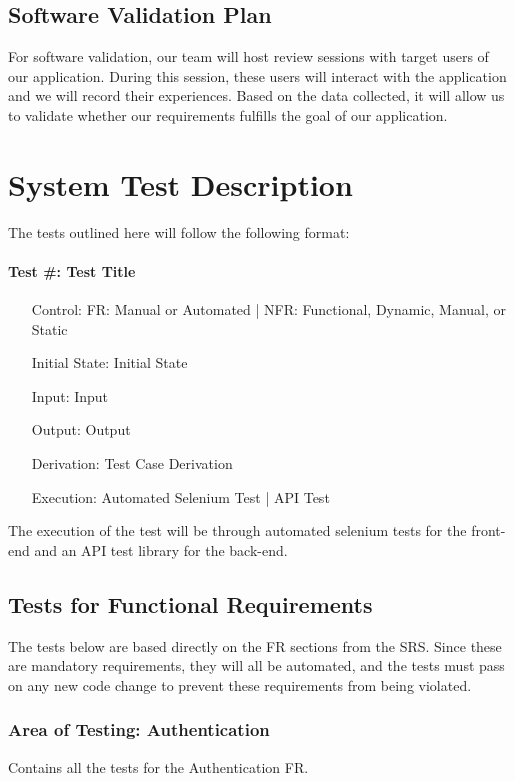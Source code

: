 \documentclass[12pt, titlepage]{article}
\begin{document}
\subsection{Software Validation Plan}
For software validation, our team will host review sessions with target users of our application. During this session, these users will interact with the application and we will record their experiences. Based on the data collected, it will allow us to validate whether our requirements fulfills the goal of our application.

\section{System Test Description}
The tests outlined here will follow the following format:
\paragraph*{Test \#{}: Test Title}
\begin{itemize}
	\item[Control:] FR: Manual or Automated | NFR: Functional, Dynamic, Manual, or Static
	\item[Initial State:] Initial State
	\item[Input:] Input
	\item[Output:] Output
	\item[Derivation:] Test Case Derivation
	\item[Execution:] Automated Selenium Test | API Test
\end{itemize}
The execution of the test will be through automated selenium tests for the front-end and an API test library for the back-end.
	
\subsection{Tests for Functional Requirements}
The tests below are based directly on the FR sections from the SRS. Since these are mandatory requirements, they will all be automated, and the tests must pass on any new code change to prevent these requirements from being violated.

\subsubsection{Area of Testing: Authentication}
Contains all the tests for the Authentication FR.
\end{document}
